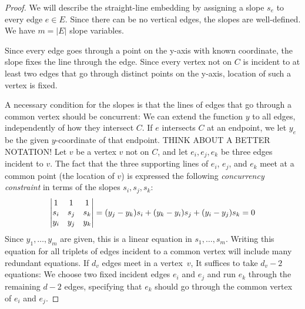 \begin{proof}
  We will describe the straight-line embedding by assigning a slope $s_e$
to every edge $e\in E$.
Since there can be no vertical edges, the slopes are well-defined.
We have $m=|E|$ slope variables.

Since every edge goes through a point on the y-axis with known
coordinate, the slope fixes the line through the edge.
 Since
every vertex not on $C$ is incident to at least two edges that go
through
distinct points on the y-axis, location of such a vertex is fixed.

A necessary condition for the slopes is that the lines of edges that
go through a common vertex should be concurrent:
We can extend the function $y$ to all edges, independently of how they
intersect $C$. If $e$ intersects $C$ at an endpoint, we let $y_e$ be
the
given $y$-coordinate of that endpoint. THINK ABOUT A BETTER NOTATION!
%
Let $v$ be a vertex $v$ not on $C$, and let $e_i, e_j, e_k$ be three
edges incident to $v$.
The fact that the three supporting lines of $e_i$, $e_j$, and $e_k$ 
meet at a common point (the location of $v$) is expressed
the following \emph{concurrency constraint} 
in terms of the slopes $s_i,s_j,s_k$:
\begin{equation}\eqlabel{slope} 
\left|
  \begin{matrix}
    1&1&1\\
s_i&s_j&s_k\\
y_i&y_j&y_k
  \end{matrix}
\right|=
   ({y_j-y_k}) s_i + ({y_k-y_i}) s_j 
          + ({y_i-y_j})s_k  = 0
\end{equation}
Since $y_1,\ldots,y_m$ are given, this is a linear equation
in $s_1,\ldots,s_m$.
Writing this equation for all triplets of edges incident to a common
vertex will include many redundant equations.
If $d_v$ edges meet in a vertex~$v$, 
 It suffices to take $d_v-2$ equations: We choose two fixed
incident edges $e_i$ and $e_j$ and run $e_k$ through the remaining
$d-2$ edges, specifying that $e_k$ should go through the common vertex
of $e_i$ and $e_j$.


\end{proof}
